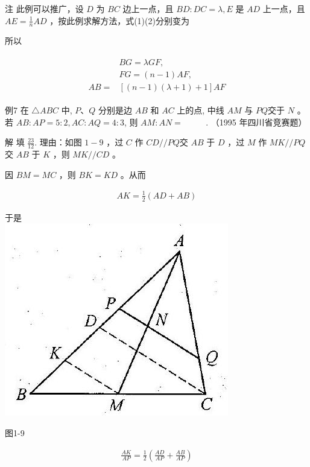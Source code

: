 \documentclass[10pt]{article}
\begin{document}
注 此例可以推广，设 $D$ 为 $B C$ 边上一点，且 $B D: D C=\lambda, E$ 是 $A D$ 上一点，且 $A E=\frac{1}{n} A D$ ，按此例求解方法，式(1)(2)分别变为

所以

\begin{align*}
\begin{aligned}
& B G=\lambda G F, \\
& F G=(n-1) A F, \\
A B= & {[(n-1)(\lambda+1)+1] A F }
\end{aligned}
\end{align*}

例7 在 $\triangle A B C$ 中, $P 、 Q$ 分别是边 $A B$ 和 $A C$ 上的点, 中线 $A M$ 与 $P Q$交于 $N$ 。若 $A B: A P=5: 2, A C: A Q=4: 3$, 则 $A M: A N=$ $\qquad$ . （1995 年四川省竞赛题）

解 填 $\frac{23}{12}$. 理由：如图 $1-9$ ，过 $C$ 作 $C D / / P Q$交 $A B$ 于 $D$ ，过 $M$ 作 $M K / / P Q$ 交 $A B$ 于 $K$ ，则 $M K / / C D$ 。

因 $B M=M C$ ，则 $B K=K D$ 。从而

\begin{align*}
A K=\frac{1}{2}(A D+A B)
\end{align*}

于是\\
\includegraphics[max width=\textwidth, center]{2024_10_30_2c8f45efd4a519b08e1ag-011}

图1-9

\begin{align*}
\frac{A K}{A P}=\frac{1}{2}\left(\frac{A D}{A P}+\frac{A B}{A P}\right)
\end{align*}
\end{document}
